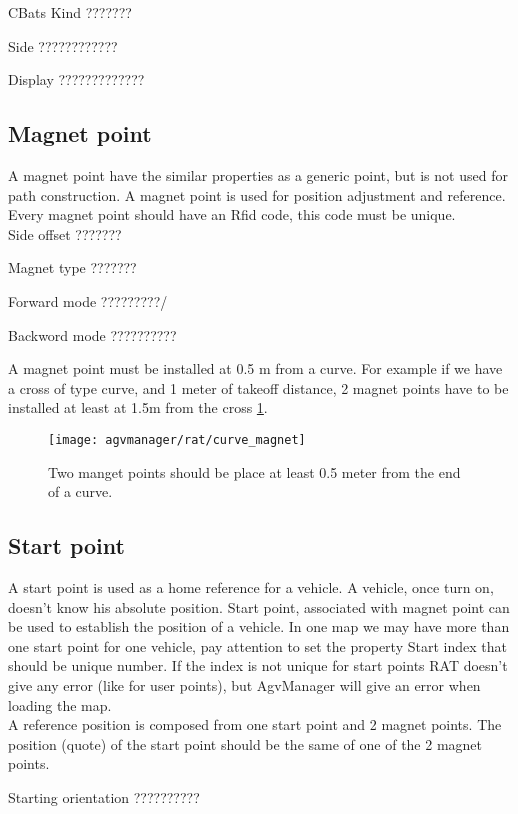 CBats Kind ???????

Side ????????????

Display ?????????????


\subsection{Magnet point}
A magnet point have the similar properties as a generic point, but is not used for path construction. A magnet point is used for position adjustment and reference. Every magnet point should have an Rfid code, this code must be unique.\\

Side offset ???????

Magnet type ???????

Forward mode ?????????/

Backword mode ??????????

A magnet point must be installed at 0.5 m from a curve. For example if we have a cross of type curve, and 1 meter of takeoff distance, 2 magnet points have to be installed at least at 1.5m from the cross \ref{fig:curve_magnet}.

\begin{figure}[h]
	\centering\texttt{[image: agvmanager/rat/curve\_magnet]}
	\caption{Two manget points should be place at least 0.5 meter from the end of a curve.}
	\label{fig:curve_magnet}
\end{figure}

%
\subsection{Start point}
A start point is used as a home reference for a vehicle. A vehicle, once turn on, doesn't know his absolute position. Start point, associated with magnet point can be used to establish the position of a vehicle. In one map we may have more than one start point for one vehicle, pay attention to set the property Start index that should be unique number. If the index is not unique for start points RAT doesn't give any error (like for user points), but AgvManager will give an error when loading the map.\\

A reference position is composed from one start point and 2 magnet points. The position (quote) of the start point should be the same of one of the 2 magnet points.

Starting orientation ??????????

